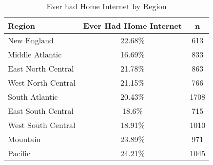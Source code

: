 \documentclass{article}
\begin{document}
\begin{table}[ht]
\centering
\begin{tabular}{lcc}
  \hline
  Region & Ever Had Home Internet & n \\ 
  \hline
  New England & 22.68\% & 613 \\ 
  Middle Atlantic & 16.69\% & 833 \\ 
  East North Central & 21.78\% & 863 \\ 
  West North Central & 21.15\% & 766 \\ 
  South Atlantic & 20.43\% & 1708 \\ 
  East South Central & 18.6\% & 715 \\ 
  West South Central & 18.91\% & 1010 \\ 
  Mountain & 23.89\% & 971 \\ 
  Pacific & 24.21\% & 1045 \\ 
   \hline
\end{tabular}
\caption*{Ever had Home Internet by Region} 
\end{table}
\end{document}
